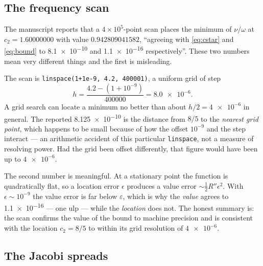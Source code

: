 \documentclass[11pt,a4paper]{article}
\begin{document}
\subsection{The frequency scan}\label{sec:scanresid}

The manuscript reports that a $4\times10^5$-point scan places the minimum of
$\nu/\omega$ at $c_2=1.60000000$ with value $0.942809041582$, ``agreeing with
\eqref{eq:cstar} and \eqref{eq:bound} to \num{8.1e-10} and \num{1.1e-16}
respectively''. These two numbers mean very different things and the first is
misleading.

The scan is \texttt{linspace(1+1e-9, 4.2, 400001)}, a uniform grid of step
\begin{equation}
  h = \frac{4.2-(1+10^{-9})}{400000} = \num{8.0e-6} .
\end{equation}
A grid search can locate a minimum no better than about $h/2=\num{4e-6}$ in
general. The reported \num{8.125e-10} is the distance from $8/5$ to the
\emph{nearest grid point}, which happens to be small because of how the offset
$10^{-9}$ and the step interact --- an arithmetic accident of this particular
\texttt{linspace}, not a measure of resolving power. Had the grid been offset
differently, that figure would have been up to $\num{4e-6}$.

The second number is meaningful. At a stationary point the function is
quadratically flat, so a location error $\epsilon$ produces a value error
$\sim\tfrac12R''\epsilon^2$. With $\epsilon\sim10^{-9}$ the value error is far
below $\varepsilon$, which is why the \emph{value} agrees to \num{1.1e-16}
--- one ulp --- while the \emph{location} does not. The honest summary is:
the scan confirms the value of the bound to machine precision and is consistent
with the location $c_2=8/5$ to within its grid resolution of $\num{4e-6}$.

\subsection{The Jacobi spreads}\label{sec:jacobiresid}
\end{document}
